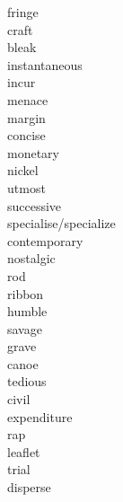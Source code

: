 \documentclass[a4paper, 11pt]{ctexart}
\begin{document}
\begin{multicols*}{3}
\begin{description}
\item[fringe]

\item[craft]

\item[bleak]

\item[instantaneous]

\item[incur]

\item[menace]

\item[margin]

\item[concise]

\item[monetary]

\item[nickel]

\item[utmost]

\item[successive]

\item[specialise/specialize]

\item[contemporary]

\item[nostalgic]

\item[rod]

\item[ribbon]

\item[humble]

\item[savage]

\item[grave]

\item[canoe]

\item[tedious]

\item[civil]

\item[expenditure]

\item[rap]

\item[leaflet]

\item[trial]

\item[disperse]


\end{description}
\end{multicols*}
\end{document}
